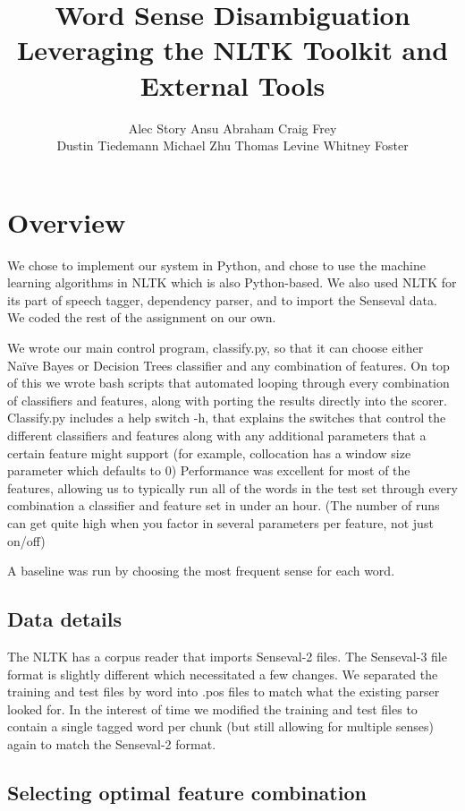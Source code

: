 \documentclass{article}
\title{Word Sense Disambiguation\\
\small{Leveraging the NLTK Toolkit and External Tools}}
\author{
Alec Story
Ansu Abraham
Craig Frey\\
Dustin Tiedemann
Michael Zhu
Thomas Levine
Whitney Foster\\
}
\newcommand{\Naive}{Na\"ive}
\begin{document}
\maketitle

\section{Overview}

We  chose to implement our system in Python, and chose to use the machine
learning algorithms in NLTK which is also Python-based.  We also used NLTK for
its part of speech tagger, dependency parser, and to import the Senseval data.
We coded the rest of the assignment on our own.

We wrote our main control program, classify.py, so that it can choose either
\Naive{} Bayes or Decision Trees classifier and any 
combination of  features. On top of this we wrote bash scripts that automated
looping through every combination of classifiers and features, along with
porting the results directly into the scorer.  Classify.py includes a help
switch -h, that explains the switches that control the different classifiers
and features along with any additional parameters that a certain feature might
support (for example, collocation has a window size parameter which defaults to
0) Performance was excellent for most of the features, allowing us to typically
run all of the words in the test set through every combination a classifier and
feature set in under an hour. (The number of runs can get quite high when you
factor in several parameters per feature, not just on/off)

A baseline was run by choosing the most frequent sense for each word.

\subsection{Data details}

The NLTK has a corpus reader that imports Senseval-2 files. The Senseval-3
file format is slightly  different which necessitated a few changes. We
separated the training  and test files by word into .pos files to match  what
the existing parser looked for. In the interest of time we modified  the
training and test files to contain a single tagged word per chunk (but still
allowing for multiple senses) again to match the Senseval-2  format.

\subsection{Selecting optimal feature combination}
\newcommand\ward{backward} %
\end{document}
